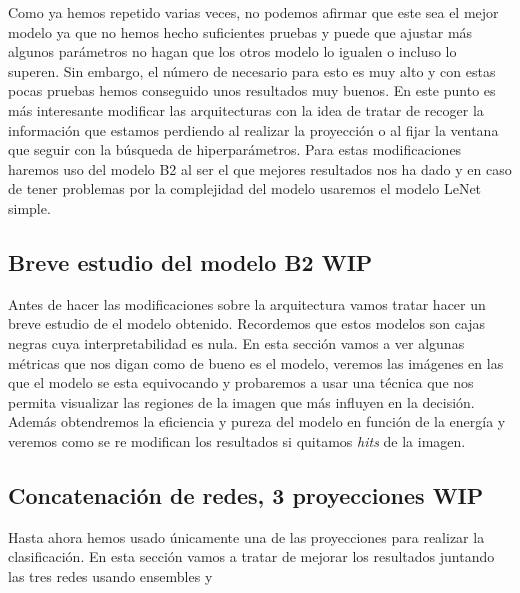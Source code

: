 \documentclass[a4paper,12pt,twoside,titlepage]{article}
\begin{document}
Como ya hemos repetido varias veces, no podemos afirmar que este sea el mejor modelo ya que no hemos hecho suficientes pruebas y puede que ajustar más algunos parámetros no hagan que los otros modelo lo igualen o incluso lo superen. Sin embargo, el número de necesario para esto es muy alto y con estas pocas pruebas hemos conseguido unos resultados muy buenos. En este punto es más interesante modificar las arquitecturas con la idea de tratar de recoger la información que estamos perdiendo al realizar la proyección o al fijar la ventana que seguir con la búsqueda de hiperparámetros. Para estas modificaciones haremos uso del modelo B2 al ser el que mejores resultados nos ha dado y en caso de tener problemas por la complejidad del modelo usaremos el modelo LeNet simple.

\subsection{Breve estudio del modelo B2 WIP}

Antes de hacer las modificaciones sobre la arquitectura vamos tratar hacer un breve estudio de el modelo obtenido. Recordemos que estos modelos son cajas negras cuya interpretabilidad es nula. En esta sección vamos a ver algunas métricas que nos digan como de bueno es el modelo, veremos las imágenes en las que el modelo se esta equivocando y probaremos a usar una técnica que nos permita visualizar las regiones de la imagen que más influyen en la decisión. Además obtendremos la eficiencia y pureza del modelo en función de la energía y veremos como se re modifican los resultados si quitamos \textit{hits} de la imagen.

\subsection{Concatenación de redes, 3 proyecciones WIP}

Hasta ahora hemos usado únicamente una de las proyecciones para realizar la clasificación. En esta sección vamos a tratar de mejorar los resultados juntando las tres redes usando ensembles y


\end{document}
